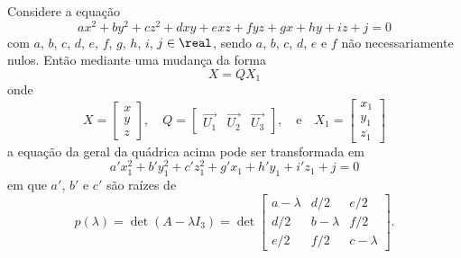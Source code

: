 \begin{teorema}
    Considere a equação
    \[
        ax^2 + by^2 + cz^2 + dxy + exz + fyz + gx + hy + iz + j = 0
    \]
    com $a$, $b$, $c$, $d$, $e$, $f$, $g$, $h$, $i$, $j \in \real$, sendo $a$, $b$, $c$, $d$, $e$ e $f$ não necessariamente nulos. Então mediante uma mudança da forma
    \[
        X = Q X_1
    \]
    onde
    \[
        X = \begin{bmatrix}
            x \\y\\z
        \end{bmatrix}, \quad
        Q = \begin{bmatrix}
            \vec{U_1} & \vec{U_2} & \vec{U_3}
        \end{bmatrix}, \quad\mbox{e}\quad
        X_1 = \begin{bmatrix}
            x_1 \\y_1\\z_1
        \end{bmatrix}
    \]
    a equação da geral da quádrica acima pode ser transformada em
    \[
        a'x_1^2 + b'y_1^2 + c'z_1^2 + g'x_1 + h'y_1 + i'z_1 + j = 0
    \]
    em que $a'$, $b'$ e $c'$ são raízes de
    \[
        p(\lambda) = \det(A - \lambda I_3) = \det \begin{bmatrix}
            a - \lambda & d/2         & e/2         \\
            d/2         & b - \lambda & f/2         \\
            e/2         & f/2         & c - \lambda
        \end{bmatrix}.
    \]


\end{teorema}
